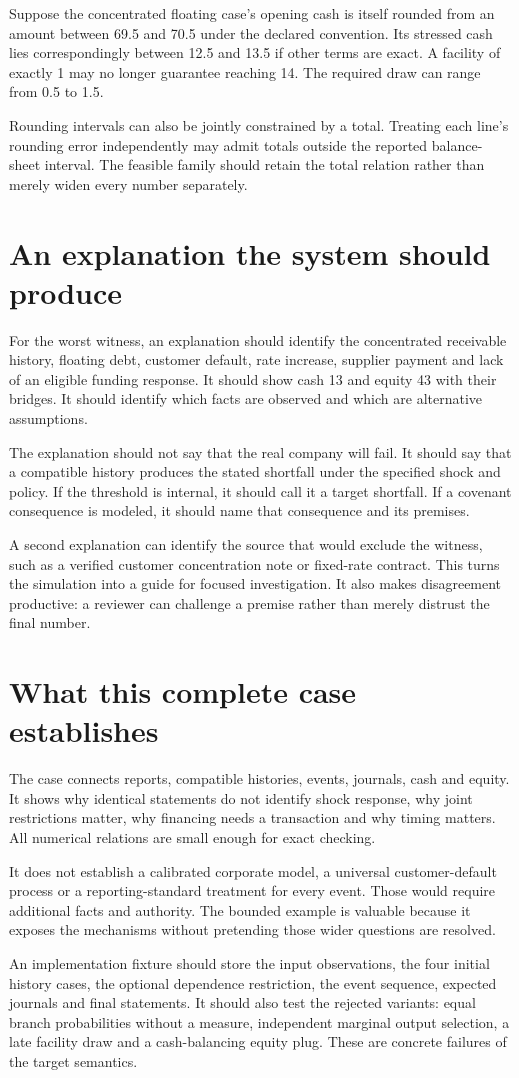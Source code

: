 Suppose the concentrated floating case's opening cash is itself rounded from an amount between 69.5 and 70.5 under the declared convention. Its stressed cash lies correspondingly between 12.5 and 13.5 if other terms are exact. A facility of exactly 1 may no longer guarantee reaching 14. The required draw can range from 0.5 to 1.5.

Rounding intervals can also be jointly constrained by a total. Treating each line's rounding error independently may admit totals outside the reported balance-sheet interval. The feasible family should retain the total relation rather than merely widen every number separately.

\section{An explanation the system should produce}
For the worst witness, an explanation should identify the concentrated receivable history, floating debt, customer default, rate increase, supplier payment and lack of an eligible funding response. It should show cash 13 and equity 43 with their bridges. It should identify which facts are observed and which are alternative assumptions.

The explanation should not say that the real company will fail. It should say that a compatible history produces the stated shortfall under the specified shock and policy. If the threshold is internal, it should call it a target shortfall. If a covenant consequence is modeled, it should name that consequence and its premises.

A second explanation can identify the source that would exclude the witness, such as a verified customer concentration note or fixed-rate contract. This turns the simulation into a guide for focused investigation. It also makes disagreement productive: a reviewer can challenge a premise rather than merely distrust the final number.

\section{What this complete case establishes}
The case connects reports, compatible histories, events, journals, cash and equity. It shows why identical statements do not identify shock response, why joint restrictions matter, why financing needs a transaction and why timing matters. All numerical relations are small enough for exact checking.

It does not establish a calibrated corporate model, a universal customer-default process or a reporting-standard treatment for every event. Those would require additional facts and authority. The bounded example is valuable because it exposes the mechanisms without pretending those wider questions are resolved.

An implementation fixture should store the input observations, the four initial history cases, the optional dependence restriction, the event sequence, expected journals and final statements. It should also test the rejected variants: equal branch probabilities without a measure, independent marginal output selection, a late facility draw and a cash-balancing equity plug. These are concrete failures of the target semantics.
